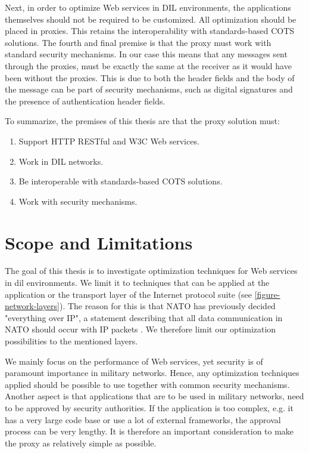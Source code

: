 Next, in order to optimize Web services in DIL environments, the applications
themselves should not be required to be customized. All optimization should be
placed in proxies. This retains the interoperability with standards-based COTS
solutions. The fourth and final premise is that the proxy must work with standard
security mechanisms. In our case this means that any messages sent through the
proxies, must be exactly the same at the receiver as it would have been without
the proxies. This is due to both the header fields and the body of the message
can be part of security mechanisms, such as digital signatures and the presence
of authentication header fields.

To summarize, the premises of this thesis are that the proxy solution must:

\begin{enumerate}
    \item Support HTTP RESTful and W3C Web services.
    \item Work in DIL networks.
    \item Be interoperable with standards-based COTS solutions.
    \item Work with security mechanisms.
\end{enumerate}

\section{Scope and Limitations}

The goal of this thesis is to investigate optimization techniques for Web
services in \gls{dil} environments. We limit it to techniques that can be
applied at the application or the transport layer of the Internet protocol
suite (see \cref{figure-network-layers}). The reason for this is that NATO has
previously decided "everything over IP", a statement describing that all data
communication in NATO should occur with IP packets \cite{nnec-study}. We
therefore limit our optimization possibilities to the mentioned layers.

We mainly focus on the performance of Web services, yet security is of paramount
importance in military networks. Hence, any optimization techniques applied
should be possible to use together with common security mechanisms. Another
aspect is that applications that are to be used in military networks, need to be
approved by security authorities. If the application is too complex, e.g. it has
a very large code base or use a lot of external frameworks, the approval process
can be very lengthy. It is therefore an important consideration to make
the proxy as relatively simple as possible.


